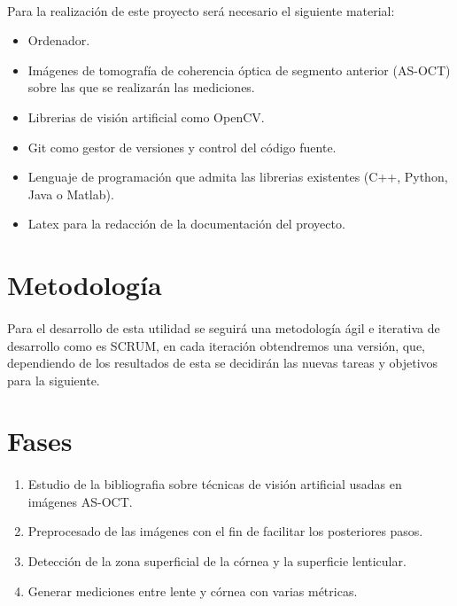 \documentclass[12pt]{article}
\begin{document}
\paragraph{}
Para la realización de este proyecto será necesario el siguiente material:
\begin{itemize}
	\item Ordenador.
	\item Imágenes de tomografía de coherencia óptica de segmento anterior (AS-OCT)\cite{AS-OCT} sobre las que se realizarán las mediciones.
	\item Librerias de visión artificial como OpenCV\cite{cv2}.
	\item Git\cite{git} como gestor de versiones y control del código fuente.
	\item Lenguaje de programación que admita las librerias existentes (C++, Python, Java o Matlab).
	\item Latex\cite{latex} para la redacción de la documentación del proyecto.
\end{itemize}

\newpage
\section{Metodología}
\paragraph{}
Para el desarrollo de esta utilidad se seguirá una metodología ágil e iterativa de desarrollo como es SCRUM, en cada iteración obtendremos una versión, que, dependiendo de los resultados de esta se decidirán las nuevas tareas y objetivos para la siguiente. 

\newpage
\section{Fases}
\paragraph{}
\begin{enumerate}
	\item Estudio de la bibliografia sobre técnicas de visión artificial usadas en imágenes AS-OCT.
	\item Preprocesado de las imágenes con el fin de facilitar los posteriores pasos.
	\item Detección de la zona superficial de la córnea y la superficie lenticular.
	\item Generar mediciones entre lente y córnea con varias métricas.
\end{enumerate}
\end{document}

